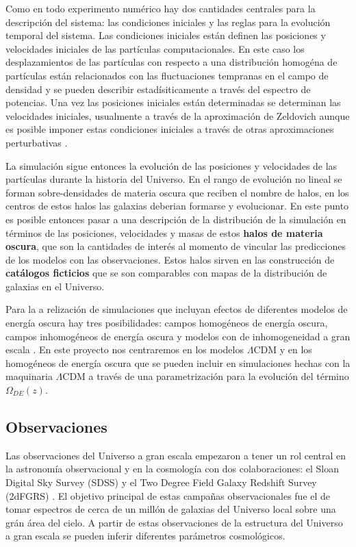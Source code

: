 \documentclass[spanish,notitlepage,letterpaper,11pt]{article} %
\begin{document}
Como en todo experimento num\'erico
hay dos cantidades centrales para la descripci\'on del sistema: las
condiciones iniciales y las reglas para la evoluci\'on temporal del
sistema.  Las condiciones iniciales est\'an definen las
posiciones y velocidades iniciales de las part\'iculas
computacionales. En este caso los desplazamientos de las part\'iculas
con respecto a una distribuci\'on homog\'ena de part\'iculas est\'an
relacionados con las fluctuaciones tempranas en el campo de densidad y
se pueden describir estad\'isiticamente a trav\'es del espectro de
potencias. Una vez las posiciones iniciales est\'an determinadas se
determinan las velocidades iniciales, usualmente a trav\'es de la
aproximaci\'on de Zeldovich aunque es posible imponer estas
condiciones iniciales a trav\'es de otras aproximaciones perturbativas
\cite{2014MNRAS.439.3630W}. 

La simulaci\'on sigue entonces la evoluci\'on de las posiciones y
velocidades de las part\'iculas durante la historia del
Universo. En el rango de evoluci\'on no lineal se forman
sobre-densidades de materia oscura que reciben el nombre de halos, en
los centros de estos halos las galaxias deberian formarse y
evolucionar. En este punto es posible entonces pasar a una
descripci\'on de la distribuci\'on de la simulaci\'on en t\'erminos de
las posiciones, velocidades y masas de estos {\bf halos de materia
  oscura}, que son la cantidades de inter\'es al momento de vincular
las predicciones de los modelos con las observaciones. Estos halos
sirven en las construcci\'on de {\bf cat\'alogos ficticios} que se
son comparables con mapas de la distribuci\'on de galaxias en el
Universo.

Para la a relizaci\'on de simulaciones  que incluyan
efectos de diferentes modelos de energ\'ia oscura hay tres
posibilidades: campos homog\'eneos de energ\'ia oscura, campos
inhomog\'eneos de energ\'ia oscura y modelos con de inhomogeneidad a
gran escala \cite{2012PDU.....1..162B}. En este proyecto nos
centraremos en los modelos $\Lambda$CDM y en los homog\'eneos de energ\'ia
oscura que se pueden incluir en simulaciones hechas con la maquinaria
$\Lambda$CDM a trav\'es de una parametrizaci\'on para la evoluci\'on
del t\'ermino $\Omega_{DE}(z)$.

\subsection{Observaciones}

Las observaciones del Universo a gran escala empezaron a tener un rol
central en la astronom\'ia observacional y en la cosmolog\'ia con dos
colaboraciones: el Sloan Digital Sky Survey (SDSS) \cite{SDSS} y el Two Degree
Field Galaxy Redshift Survey (2dFGRS) \cite{2dF}. El objetivo
principal de estas campa\~nas observacionales fue el de tomar
espectros de cerca de un mill\'on de galaxias del Universo local sobre
una gr\'an \'area del cielo. A partir de estas observaciones de la
estructura del Universo a gran escala se pueden inferir diferentes
par\'ametros cosmol\'ogicos.
\end{document}
